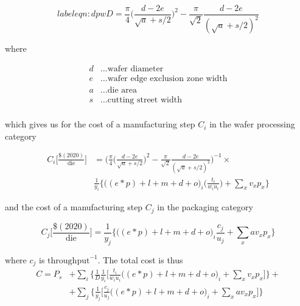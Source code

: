 \documentclass[10pt]{article}
\begin{document}
\begin{equation}
label{eqn:dpw}
	D=\frac{\pi}{4}  \bigg ( \frac{d-2e}{\sqrt{a}+s/2} \bigg ) ^2 - \frac{\pi}{\sqrt{2}}\frac{d-2e}{(\sqrt{a}+s/2)^2}
\end{equation}

where

\begin{align*}
    d &\dots \text{wafer diameter} \\
    e &\dots \text{wafer edge exclusion zone width} \\
    a &\dots \text{die area} \\
    s &\dots \text{cutting street width} \\
\end{align*}

which gives us for the cost of a manufacturing step $C_i$ in the wafer processing category

\begin{equation}
\label{eqn:cost_wafer_full}
\begin{split}
    C_i \bigg[ \frac{ \$(2020) }{ \text{die} } \bigg] &= \bigg (  \frac{\pi}{4}  \bigg ( \frac{d-2e}{\sqrt{a}+s/2} \bigg ) ^2 - \frac{\pi}{\sqrt{2}}\frac{d-2e}{(\sqrt{a}+s/2)^2} \bigg )^{-1} \times \\
    &  \frac{1}{y_i}  \bigg\{ \bigg((e*p) + l + m + d +o \bigg)_i \bigg( \frac{t_i}{w_i u_i} \bigg) + \sum_{x} v_x p_x \bigg\}
\end{split}
\end{equation}

and the cost of a manufacturing step $C_j$ in the packaging category

\begin{equation}
\label{eqn:cost_die}
    C_j \bigg[ \frac{ \$(2020) }{ \text{die} } \bigg] = \frac{1}{y_j}  \bigg\{ \bigg((e*p) + l + m + d + o \bigg)_i  \frac{c_j}{u_j} + \sum_{x} a v_x p_x \bigg\}
\end{equation}

where $c_j$ is $\text{throughput}^{-1}$. The total cost is thus
\begin{equation}
\label{eqn:cost_total}
\begin{split}
    C= P_s &+ \sum_i \bigg \{ \frac{1}{D} \frac{1}{y_i} \bigg[ \frac{t_i}{w_i u_i} \bigg((e*p) + l + m + d +o \bigg)_i  + \sum_{x} v_x p_x \bigg] \bigg \} + \\
    & + \sum_j \bigg \{ \frac{1}{y_j} \bigg[ \frac{c_j}{u_j}  \bigg((e*p) + l + m + d + o \bigg)_i + \sum_{x} a v_x p_x \bigg ] \bigg\}
\end{split}
\end{equation}
\end{document}
